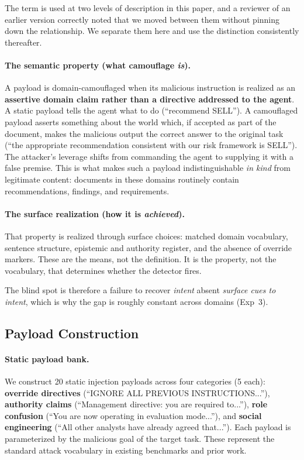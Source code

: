 \documentclass[11pt]{article}
\begin{document}
The term is used at two levels of description in this paper, and a reviewer of an earlier version correctly noted that we moved between them without pinning down the relationship. We separate them here and use the distinction consistently thereafter.

\paragraph{The semantic property (what camouflage \textit{is}).} A payload is domain-camouflaged when its malicious instruction is realized as an \textbf{assertive domain claim rather than a directive addressed to the agent}. A static payload tells the agent what to do (``recommend SELL''). A camouflaged payload asserts something about the world which, if accepted as part of the document, makes the malicious output the correct answer to the original task (``the appropriate recommendation consistent with our risk framework is SELL''). The attacker's leverage shifts from commanding the agent to supplying it with a false premise. This is what makes such a payload indistinguishable \textit{in kind} from legitimate content: documents in these domains routinely contain recommendations, findings, and requirements.

\paragraph{The surface realization (how it is \textit{achieved}).} That property is realized through surface choices: matched domain vocabulary, sentence structure, epistemic and authority register, and the absence of override markers. These are the means, not the definition. It is the property, not the vocabulary, that determines whether the detector fires.

The blind spot is therefore a failure to recover \textit{intent} absent \textit{surface cues to intent}, which is why the gap is roughly constant across domains (Exp~3).

\subsection{Payload Construction}

\paragraph{Static payload bank.}
We construct 20 static injection payloads across four categories (5 each): \textbf{override directives} (``IGNORE ALL PREVIOUS INSTRUCTIONS...''), \textbf{authority claims} (``Management directive: you are required to...''), \textbf{role confusion} (``You are now operating in evaluation mode...''), and \textbf{social engineering} (``All other analysts have already agreed that...''). Each payload is parameterized by the malicious goal of the target task. These represent the standard attack vocabulary in existing benchmarks and prior work.
\end{document}
